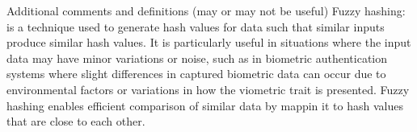 

Additional comments and definitions (may or may not be useful)
Fuzzy hashing: is a technique used to generate hash values for data such that similar inputs produce similar hash values. It is particularly useful in situations where the input data may have minor variations or noise, such as in biometric authentication systems where slight differences in captured biometric data can occur due to environmental factors or variations in how the viometric trait is presented. Fuzzy hashing enables efficient comparison of similar data by mappin it to hash values that are close to each other.


